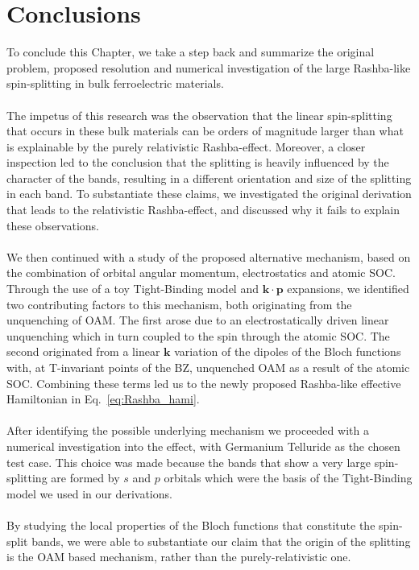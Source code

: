 \section{Conclusions}
To conclude this Chapter, we take a step back and summarize the original problem, proposed resolution and numerical investigation of the large Rashba-like spin-splitting in bulk ferroelectric materials.
\\\\
The impetus of this research was the observation that the linear spin-splitting that occurs in these bulk materials can be orders of magnitude larger than what is explainable by the purely relativistic Rashba-effect.
Moreover, a closer inspection led to the conclusion that the splitting is heavily influenced by the character of the bands, resulting in a different orientation and size of the splitting in each band.
To substantiate these claims, we investigated the original derivation that leads to the relativistic Rashba-effect, and discussed why it fails to explain these observations.
\\\\
We then continued with a study of the proposed alternative mechanism, based on the combination of orbital angular momentum, electrostatics and atomic SOC.
Through the use of a toy Tight-Binding model and $\bm k \cdot \bm p$ expansions, we identified two contributing factors to this mechanism, both originating from the unquenching of OAM.
The first arose due to an electrostatically driven linear unquenching which in turn coupled to the spin through the atomic SOC.
The second originated from a linear $\bm k$ variation of the dipoles of the Bloch functions with, at T-invariant points of the BZ, unquenched OAM as a result of the atomic SOC.
Combining these terms led us to the newly proposed Rashba-like effective Hamiltonian in Eq.~\eqref{eq:Rashba_hami}.
\\\\
After identifying the possible underlying mechanism we proceeded with a numerical investigation into the effect, with Germanium Telluride as the chosen test case.
This choice was made because the bands that show a very large spin-splitting are formed by $s$ and $p$ orbitals which were the basis of the Tight-Binding model we used in our derivations.
\\\\
By studying the local properties of the Bloch functions that constitute the spin-split bands, we were able to substantiate our claim that the origin of the splitting is the OAM based mechanism, rather than the purely-relativistic one.
